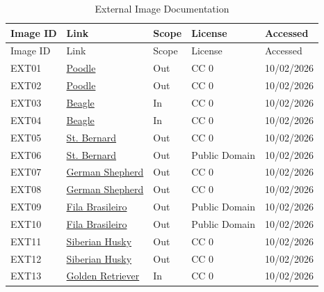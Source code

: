 \documentclass[12pt, a4paper]{article}
\begin{document}
\begin{longtable}{@{}
p{1.4cm}
>{\raggedright\arraybackslash}p{4.2cm}
p{1cm}
p{2.2cm}
p{1.8cm}
@{}}
  \caption{External Image Documentation} \\
  \toprule
  Image ID & Link & Scope & License & Accessed \\
  \midrule
  \endfirsthead

  \toprule
  Image ID & Link & Scope & License & Accessed \\
  \midrule
  \endhead

  \bottomrule
  \endlastfoot

  EXT01 & \href{https://commons.wikimedia.org/wiki/File:Poodle.jpg}{Poodle} & Out & CC 0 & 10/02/2026 \\
  EXT02 & \href{https://commons.wikimedia.org/wiki/File:Poodle_posing_in_profile.jpg}{Poodle} & Out & CC 0 & 10/02/2026 \\
  EXT03 & \href{https://commons.wikimedia.org/wiki/File:Fat_Beagle.jpg}{Beagle} & In & CC 0 & 10/02/2026 \\
  EXT04 & \href{https://commons.wikimedia.org/wiki/File:Beagle-dog.jpg}{Beagle} & In & CC 0 & 10/02/2026 \\
  EXT05 & \href{https://commons.wikimedia.org/wiki/File:St._Bernard_dog_with_barrel.jpg}{St. Bernard} & Out & CC 0 & 10/02/2026 \\
  EXT06 & \href{https://commons.wikimedia.org/wiki/File:Bernhardiner07.jpg}{St. Bernard} & Out & Public Domain & 10/02/2026 \\
  EXT07 & \href{https://commons.wikimedia.org/wiki/File:German-shepherd-4055031920.jpg}{German Shepherd} & Out & CC 0 & 10/02/2026 \\
  EXT08 & \href{https://commons.wikimedia.org/wiki/File:German_Shepherd_In_Iran_-_Mashhad_City_02.jpg}{German Shepherd} & Out & CC 0 & 10/02/2026 \\
  EXT09 & \href{https://commons.wikimedia.org/wiki/File:Kalimba02.jpg}{Fila Brasileiro} & Out & Public Domain & 10/02/2026 \\
  EXT10 & \href{https://commons.wikimedia.org/wiki/File:Kalimba01.jpg}{Fila Brasileiro} & Out & Public Domain & 10/02/2026 \\
  EXT11 & \href{https://commons.wikimedia.org/wiki/File:Siberian-husky-1291343_1920.jpg}{Siberian Husky} & Out & CC 0 & 10/02/2026 \\
  EXT12 & \href{https://commons.wikimedia.org/wiki/File:Husky1.JPG}{Siberian Husky} & Out & CC 0 & 10/02/2026 \\
  EXT13 & \href{https://commons.wikimedia.org/wiki/File:Golden_Retriever2.JPG}{Golden Retriever} & In & CC 0 & 10/02/2026 \\

\end{longtable}
\end{document}
